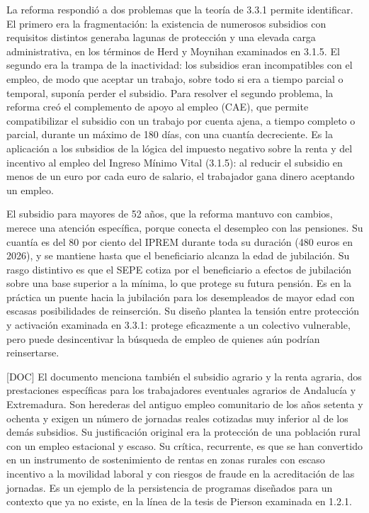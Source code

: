 \documentclass[10pt,a4paper]{article}
\begin{document}
La reforma respondió a dos problemas que la teoría de 3.3.1 permite identificar. El primero era la fragmentación: la existencia de numerosos subsidios con requisitos distintos generaba lagunas de protección y una elevada carga administrativa, en los términos de Herd y Moynihan examinados en 3.1.5. El segundo era la trampa de la inactividad: los subsidios eran incompatibles con el empleo, de modo que aceptar un trabajo, sobre todo si era a tiempo parcial o temporal, suponía perder el subsidio. Para resolver el segundo problema, la reforma creó el complemento de apoyo al empleo (CAE), que permite compatibilizar el subsidio con un trabajo por cuenta ajena, a tiempo completo o parcial, durante un máximo de 180 días, con una cuantía decreciente. Es la aplicación a los subsidios de la lógica del impuesto negativo sobre la renta y del incentivo al empleo del Ingreso Mínimo Vital (3.1.5): al reducir el subsidio en menos de un euro por cada euro de salario, el trabajador gana dinero aceptando un empleo.

El subsidio para mayores de 52 años, que la reforma mantuvo con cambios, merece una atención específica, porque conecta el desempleo con las pensiones. Su cuantía es del 80 por ciento del IPREM durante toda su duración (480 euros en 2026), y se mantiene hasta que el beneficiario alcanza la edad de jubilación. Su rasgo distintivo es que el SEPE cotiza por el beneficiario a efectos de jubilación sobre una base superior a la mínima, lo que protege su futura pensión. Es en la práctica un puente hacia la jubilación para los desempleados de mayor edad con escasas posibilidades de reinserción. Su diseño plantea la tensión entre protección y activación examinada en 3.3.1: protege eficazmente a un colectivo vulnerable, pero puede desincentivar la búsqueda de empleo de quienes aún podrían reinsertarse.

[DOC] El documento menciona también el subsidio agrario y la renta agraria, dos prestaciones específicas para los trabajadores eventuales agrarios de Andalucía y Extremadura. Son herederas del antiguo empleo comunitario de los años setenta y ochenta y exigen un número de jornadas reales cotizadas muy inferior al de los demás subsidios. Su justificación original era la protección de una población rural con un empleo estacional y escaso. Su crítica, recurrente, es que se han convertido en un instrumento de sostenimiento de rentas en zonas rurales con escaso incentivo a la movilidad laboral y con riesgos de fraude en la acreditación de las jornadas. Es un ejemplo de la persistencia de programas diseñados para un contexto que ya no existe, en la línea de la tesis de Pierson examinada en 1.2.1.
\end{document}
